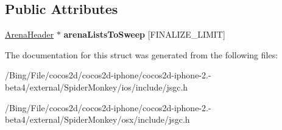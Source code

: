 \subsection*{Public Attributes}
\begin{DoxyCompactItemize}
\item 
\hypertarget{structjs_1_1gc_1_1_arena_lists_abf41926b28539af1c6fcd54ef7657f99}{\hyperlink{structjs_1_1gc_1_1_arena_header}{Arena\-Header} $\ast$ {\bfseries arena\-Lists\-To\-Sweep} \mbox{[}F\-I\-N\-A\-L\-I\-Z\-E\-\_\-\-L\-I\-M\-I\-T\mbox{]}}\label{structjs_1_1gc_1_1_arena_lists_abf41926b28539af1c6fcd54ef7657f99}

\end{DoxyCompactItemize}


The documentation for this struct was generated from the following files\-:\begin{DoxyCompactItemize}
\item 
/\-Bing/\-File/cocos2d/cocos2d-\/iphone/cocos2d-\/iphone-\/2.-\/beta4/external/\-Spider\-Monkey/ios/include/jsgc.\-h\item 
/\-Bing/\-File/cocos2d/cocos2d-\/iphone/cocos2d-\/iphone-\/2.-\/beta4/external/\-Spider\-Monkey/osx/include/jsgc.\-h\end{DoxyCompactItemize}

